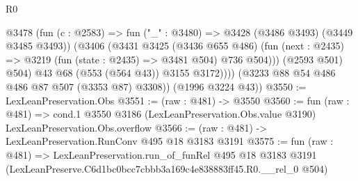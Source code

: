 \begin{lexlean}{R0}
\begin{coremodule}
                @3478
                  (fun (c : @2583) => fun ("_" : @3480) => @3428 (@3486 @3493) (@3449 @3485 @3493))
                  (@3406
                    (@3431
                      @3425
                      (@3436 @655 @486)
                      (fun (next : @2435) => @3219 (fun (state : @2435) => @3481 @504) @736 @504)))
                  (@2593 @501)
                  @504)
                @43
                @68
                (@553 (@564 @43))
                @3155
                @3172))))
        (@3233 @88 @54 @486 @486 @87 @507 (@3353 @87) @3308))
      (@1996 @3224 @43))
@3550 := LexLeanPreservation.Obs
@3551 := (raw : @481) -> @3550
@3560 := fun (raw : @481) =>
  cond.{1} @3550 @3186 (LexLeanPreservation.Obs.value @3190) LexLeanPreservation.Obs.overflow
@3566 := (raw : @481) -> LexLeanPreservation.RunConv @495 @18 @3183 @3191
@3575 := fun (raw : @481) =>
  LexLeanPreservation.run_of_funRel
    @495
    @18
    @3183
    @3191
    (LexLeanPreserve.C6d1bc0bcc7cbbb3a169c4e838883ff45.R0.__rel_0 @504)
\end{coremodule}
\end{lexlean}
